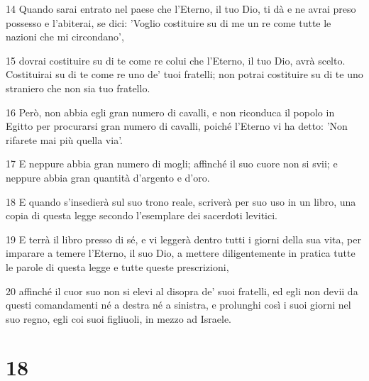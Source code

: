 \par 14 Quando sarai entrato nel paese che l'Eterno, il tuo Dio, ti dà e ne avrai preso possesso e l'abiterai, se dici: 'Voglio costituire su di me un re come tutte le nazioni che mi circondano',
\par 15 dovrai costituire su di te come re colui che l'Eterno, il tuo Dio, avrà scelto. Costituirai su di te come re uno de' tuoi fratelli; non potrai costituire su di te uno straniero che non sia tuo fratello.
\par 16 Però, non abbia egli gran numero di cavalli, e non riconduca il popolo in Egitto per procurarsi gran numero di cavalli, poiché l'Eterno vi ha detto: 'Non rifarete mai più quella via'.
\par 17 E neppure abbia gran numero di mogli; affinché il suo cuore non si svii; e neppure abbia gran quantità d'argento e d'oro.
\par 18 E quando s'insedierà sul suo trono reale, scriverà per suo uso in un libro, una copia di questa legge secondo l'esemplare dei sacerdoti levitici.
\par 19 E terrà il libro presso di sé, e vi leggerà dentro tutti i giorni della sua vita, per imparare a temere l'Eterno, il suo Dio, a mettere diligentemente in pratica tutte le parole di questa legge e tutte queste prescrizioni,
\par 20 affinché il cuor suo non si elevi al disopra de' suoi fratelli, ed egli non devii da questi comandamenti né a destra né a sinistra, e prolunghi così i suoi giorni nel suo regno, egli coi suoi figliuoli, in mezzo ad Israele.

\chapter{18}

